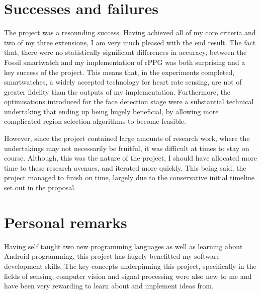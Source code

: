 \section{Successes and failures}
The project was a resounding success. Having achieved all of my core criteria and two of my three extensions, I am very much pleased with the end result.
The fact that, there were no statistically significant differences in accuracy, between the Fossil smartwatch and my implementation of rPPG 
was both surprising and a key success of the project. This means that, in the experiments completed, smartwatches, a widely accepted technology for heart
rate sensing, are not of greater fidelity than the outputs of my implementation.
Furthermore, the optimisations introduced for the face detection stage were a substantial technical undertaking that ending up being hugely beneficial, by
allowing more complicated region selection algorithms to become feasible.
\par 
However, since the project contained large amounts of research work, where the undertakings may not necessarily be fruitful, it was difficult at times to stay on course.
Although, this was the nature of the project, I should have allocated more time to these research avenues, and iterated more quickly. This being said, the project
managed to finish on time, largely due to the conservative initial timeline set out in the proposal.

\section{Personal remarks}
Having self taught two new programming languages as well as learning about Android programming, this project has hugely benefitted my software development 
skills. The key concepts underpinning this project, specifically in the fields of sensing, computer vision and signal processing were also new to me 
and have been very rewarding to learn about and implement ideas from.

